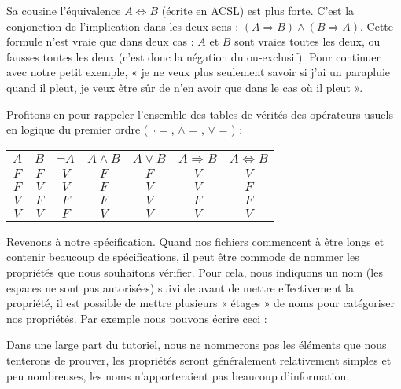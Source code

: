 Sa cousine l'équivalence $A \Leftrightarrow B$ (écrite  en ACSL)
est plus forte. C'est la conjonction de l'implication dans les deux sens :
$(A \Rightarrow B) \wedge (B \Rightarrow A)$. Cette formule n'est vraie que
dans deux cas : $A$ et $B$ sont vraies toutes les deux, ou fausses 
toutes les deux (c'est donc la négation du ou-exclusif). Pour continuer avec
notre petit exemple, « je ne veux plus seulement savoir si j'ai un parapluie
quand il pleut, je veux être sûr de n'en avoir que dans le cas où il pleut ».



\begin{Information}
Profitons en pour rappeler l'ensemble des tables de vérités des opérateurs
usuels en logique du premier ordre ($\neg$ = \CodeInline{!}, $\wedge$ = \CodeInline{\&\&},
$\vee$ = \CodeInline{||}) :

\begin{longtabu}{|c|c|c|c|c|c|c|} \hline
$A$ & $B$ & $\neg A$ & $A \wedge B$ & $A \vee B$ & $A \Rightarrow B$ & $A \Leftrightarrow B$ \\ \hline
$F$ & $F$ & $V$ & $F$ & $F$ & $V$ & $V$ \\ \hline
$F$ & $V$ & $V$ & $F$ & $V$ & $V$ & $F$ \\ \hline
$V$ & $F$ & $F$ & $F$ & $V$ & $F$ & $F$ \\ \hline
$V$ & $V$ & $F$ & $V$ & $V$ & $V$ & $V$ \\ \hline
\end{longtabu}
\end{Information}


Revenons à notre spécification. Quand nos fichiers commencent à être longs et 
contenir beaucoup de spécifications, il peut être commode de nommer les 
propriétés que nous souhaitons vérifier. Pour cela, nous indiquons un nom (les 
espaces ne sont pas autorisées) suivi de \CodeInline{:} avant de mettre effectivement
la propriété, il est possible de mettre plusieurs « étages » de noms pour 
catégoriser nos propriétés. Par exemple nous pouvons écrire ceci :






Dans une large part du tutoriel, nous ne nommerons pas les éléments que nous 
tenterons de prouver, les propriétés seront généralement relativement simples
et peu nombreuses, les noms n'apporteraient pas beaucoup d'information.



